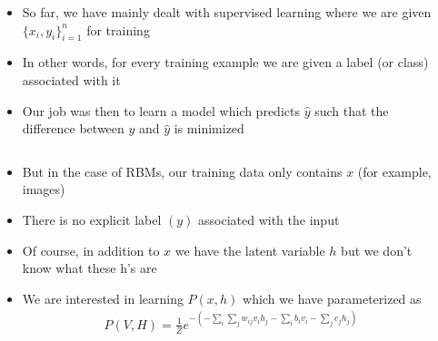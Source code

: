 \begin{frame}
\end{frame}

\begin{frame}
	\begin{columns}
			\begin{overlayarea}{\textwidth}{\textheight}
				
			\end{overlayarea}
			\begin{overlayarea}{\textwidth}{\textheight}
				\begin{itemize}\justifying
					\item<1-> So far, we have mainly dealt with supervised learning where we are given $\{x_i, y_i\}_{i=1}^{n}$ for training
					\item<2-> In other words, for every training example we are given a label (or class) associated with it
					\item<3-> Our job was then to learn a model which predicts $\hat{y}$ such that the difference between $y$ and $\hat{y}$ is minimized
				\end{itemize}
			\end{overlayarea}
	\end{columns}
\end{frame}

\begin{frame}
	\begin{columns}
		\column{0.4\textwidth}
			\begin{overlayarea}{\textwidth}{\textheight}
				
			\end{overlayarea}
		\column{0.6\textwidth}
			\begin{overlayarea}{\textwidth}{\textheight}
				\begin{itemize}\justifying
					\item<1-> But in the case of RBMs, our training data only contains $x$ (for example, images)
					\item<2-> There is no explicit label $(y)$ associated with the input
					\item<3-> Of course, in addition to $x$ we have the latent variable $h$ but we don't know what these h's are
					\item<4-> We are interested in learning $P(x, h)$ which we have parameterized as
					\begin{align*}
						P(V, H) = \frac{1}{Z} e^{-(-\sum_i\sum_j w_{ij} v_i h_j  -\sum_i b_i v_i -\sum_j c_j h_j)}
					\end{align*} 
				\end{itemize}
			\end{overlayarea}
	\end{columns}
\end{frame}

